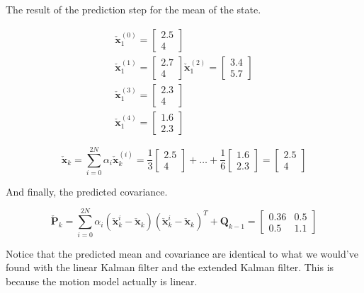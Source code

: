 The result of the prediction step for the mean of the state. 

\begin{eqnarray}
\check{\mathbf{x}}_{1}^{(0)} = 
\begin{bmatrix}
2.5 \\
4 
\end{bmatrix} \\ 
\check{\mathbf{x}}_{1}^{(1)} =  
\begin{bmatrix}
2.7 \\
4 
\end{bmatrix} 
\check{\mathbf{x}}_{1}^{(2)} = 
\begin{bmatrix}
3.4 \\
5.7 
\end{bmatrix} \\
\check{\mathbf{x}}_{1}^{(3)} = 
\begin{bmatrix}
2.3 \\
4
\end{bmatrix} \\
\check{\mathbf{x}}_{1}^{(4)} = 
\begin{bmatrix}
1.6 \\
2.3
\end{bmatrix} 
\label{ukf_example_prediction}
\end{eqnarray}


\begin{equation}
\check{\mathbf{x}}_k = \sum_{i=0}^{2N}\alpha_i \check{\mathbf{x}}_{k}^{(i)} = \frac{1}{3} \begin{bmatrix}
2.5 \\
4
\end{bmatrix} + \ldots + \frac{1}{6}
\begin{bmatrix}
1.6 \\
2.3
\end{bmatrix} =
\begin{bmatrix}
2.5 \\
4
\end{bmatrix}
\end{equation}

And finally, the predicted covariance. 

\begin{equation}
\check{\mathbf{P}}_k = \sum_{i=0}^{2N} \alpha_i (\check{\mathbf{x}}_{k}^{i} - \check{\mathbf{x}}_{k})(\check{\mathbf{x}}_{k}^{i} - \check{\mathbf{x}}_{k})^T + \mathbf{Q}_{k-1} =
\begin{bmatrix}
0.36 & 0.5 \\
0.5 & 1.1
\end{bmatrix}
\end{equation}
\begin{framed}
\theoremstyle{remark}
\begin{remark}{}

Notice that the predicted mean and
covariance are identical to what we would've found with the linear Kalman
filter and the extended Kalman filter.  This is because the motion
model actually is linear.
\end{remark}
\end{framed}

